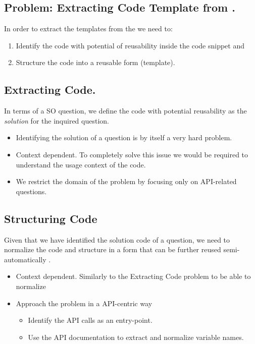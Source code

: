 \subsection{Problem: Extracting Code Template from \stackoverflow.} 
In order to extract the templates from the \stackoverflow we need to:
\begin{enumerate}
	\item Identify the code with potential of reusability inside the code snippet and 
    \item Structure the code into a reusable form (template).  
\end{enumerate}

\subsection{Extracting Code.}
In terms of a SO question, we define the code with potential reusability as the \textit{solution} for the inquired question.
\begin{itemize}
	\item Identifying the solution of a \stackoverflow question is by itself a very hard problem.
    \item Context dependent. To completely solve this issue we would be required to understand the usage context of the code.
    \item We restrict the domain of the problem by focusing only on API-related questions.
\end{itemize}



\subsection{Structuring Code}
Given that we have identified the solution code of a \stackoverflow question, we need to normalize the code and structure in a form that can be further reused semi-automatically .

\begin{itemize}
	\item Context dependent. Similarly to the Extracting Code problem to be able to normalize 
    \item Approach the problem in a API-centric way
    \begin{itemize}	
    	\item Identify the API calls as an entry-point.
        \item Use the API documentation to extract and normalize variable names.
    \end{itemize}
\end{itemize}







